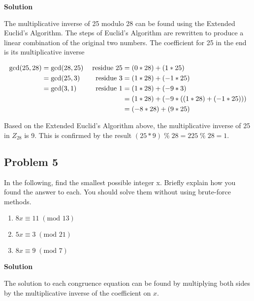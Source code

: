 \documentclass[11pt]{article}
\begin{document}
\textbf{Solution}

The multiplicative inverse of 25 modulo 28 can be found using the Extended Euclid's Algorithm. The steps of Euclid's Algorithm are rewritten to produce a linear combination of the original two numbers. The coefficient for 25 in the end is its multiplicative inverse

\begin{alignat}{4}
	\textrm{gcd}(25, 28) &= \textrm{gcd}(28, 25)\; &\textrm{residue } 25 &= (0 * 28) + (1 * 25) \notag
	\\
	&= \textrm{gcd}(25, 3)\; &\textrm{residue } 3 &= (1 * 28) + (-1 * 25) \notag
	\\		
	&= \textrm{gcd}(3, 1)\; &\textrm{residue } 1 &= (1 * 28) + (-9 * 3) \notag
	\\
	&&&= (1 * 28) + (-9 * ((1 * 28) + (-1 * 25))) \notag
	\\
	&&&= (-8 * 28) + (9 * 25) \notag
\end{alignat}

Based on the Extended Euclid's Algorithm above, the multiplicative inverse of 25 in $Z_{28}$ is 9. This is confirmed by the result $(25 * 9)\; \%\; 28 = 225\; \%\; 28 = 1$.

\pagebreak

\subsection{Problem 5}
In the following, find the smallest possible integer x. Briefly explain how you found the answer to each. You should solve them without using brute-force methods.
\begin{enumerate}[label=(\alph*)]
\item $8x \equiv 11\; (\textrm{mod } 13)$
\item $5x \equiv 3\; (\textrm{mod } 21)$
\item $8x \equiv 9\; (\textrm{mod } 7)$
\end{enumerate}

\textbf{Solution}

The solution to each congruence equation can be found by multiplying both sides by the multiplicative inverse of the coefficient on $x$.
\end{document}
